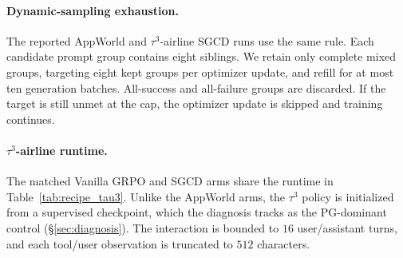 \paragraph{Dynamic-sampling exhaustion.} The reported AppWorld and
$\tau^3$-airline SGCD runs use the same rule. Each candidate prompt group
contains eight siblings. We retain only complete mixed groups, targeting eight
kept groups per optimizer update, and refill for at most ten generation batches.
All-success and all-failure groups are discarded. If the target is still unmet
at the cap, the optimizer update is skipped and training continues.

\paragraph{$\tau^3$-airline runtime.} The matched Vanilla GRPO and SGCD arms
share the runtime in Table~\ref{tab:recipe_tau3}. Unlike the AppWorld arms, the $\tau^3$ policy is
initialized from a supervised checkpoint, which the diagnosis tracks as the
PG-dominant control (\S\ref{sec:diagnosis}). The interaction is bounded to $16$
user/assistant turns, and each tool/user observation is truncated to $512$
characters.

